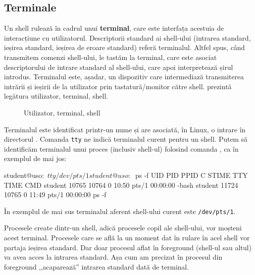 \subsection{Terminale}
\label{sec:procese-interactivitate-terminale}

Un shell rulează în cadrul unui \textbf{terminal}, care este interfața acestuia de
interacțiune cu utilizatorul. Descriptorii standard ai shell-ului (intrarea
standard, ieșirea standard, ieșirea de eroare standard) referă terminalul.
Altfel spus, când transmitem comenzi shell-ului, le tastăm la terminal, care
este asociat descriptorului de intrare standard al shell-ului, care apoi
interpretează șirul introdus. Terminalul este, așadar, un dispozitiv care
intermediază transmiterea intrării și ieșirii de la utilizator prin tastatură/monitor către
shell.  prezintă legătura utilizator, terminal, shell.

\begin{figure}[!htbp]
	\centering
	\def\svgwidth{0.8\textwidth}
	
	\caption{Utilizator, terminal, shell}
	\label{fig:process-terminal-shell}
\end{figure}

Terminalul este identificat printr-un nume și are asociată, în Linux, o intrare
în directorul . Comanda \texttt{tty} ne indică terminalul curent pentru un shell.
Putem să identificăm terminalul unui proces (inclusiv shell-ul) folosind comanda
, ca în exemplul de mai jos:

\begin{screen}
student@uso:~$ tty
/dev/pts/1
student@uso:~$ ps -f
UID        PID  PPID  C STIME TTY          TIME CMD
student  10765 10764  0 10:50 pts/1    00:00:00 -bash
student  11724 10765  0 11:49 pts/1    00:00:00 ps -f
\end{screen}

În exemplul de mai sus terminalul aferent shell-ului curent este \texttt{/dev/pts/1}.

Procesele create dintr-un shell, adică procesele copil ale shell-ului, vor
moșteni acest terminal. Procesele care se află la un moment dat în rulare în
acel shell vor partaja ieșirea standard. Dar doar procesul aflat în foreground
(shell-ul sau altul) va avea acces la intrarea standard. Așa cum am precizat în
 procesul
din foreground ,,acaparează'' intrarea standard dată de terminal.

